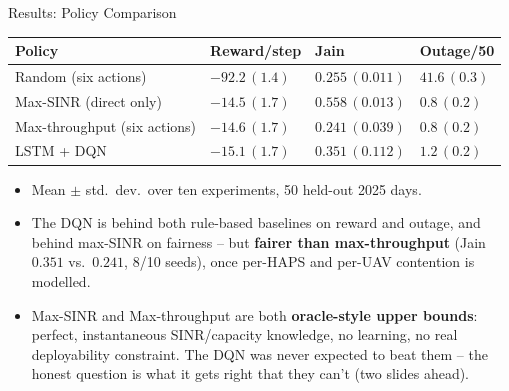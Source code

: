 \documentclass[aspectratio=169]{beamer}
\begin{document}
\begin{frame}{Results: Policy Comparison}
\footnotesize
\begin{table}
\centering
\begin{tabularx}{\linewidth}{|>{\raggedright\arraybackslash}X|>{\centering\arraybackslash}X|>{\centering\arraybackslash}X|>{\centering\arraybackslash}X|}
\hline
\textbf{Policy} & \textbf{Reward/step} & \textbf{Jain} & \textbf{Outage/50} \\
\hline
Random (six actions) & $-92.2\,(1.4)$ & $0.255\,(0.011)$ & $41.6\,(0.3)$ \\
\hline
Max-SINR (direct only) & $-14.5\,(1.7)$ & $\mathbf{0.558}\,(0.013)$ & $\mathbf{0.8}\,(0.2)$ \\
\hline
Max-throughput (six actions) & $\mathbf{-14.6}\,(1.7)$ & $0.241\,(0.039)$ & $\mathbf{0.8}\,(0.2)$ \\
\hline
LSTM + DQN & $-15.1\,(1.7)$ & $0.351\,(0.112)$ & $1.2\,(0.2)$ \\
\hline
\end{tabularx}
\end{table}
\begin{itemize}
  \item Mean $\pm$ std.\ dev.\ over ten experiments, 50 held-out 2025 days.
  \item The DQN is behind both rule-based baselines on reward and
        outage, and behind max-SINR on fairness -- but \textbf{fairer
        than max-throughput} (Jain $0.351$ vs.\ $0.241$, 8/10 seeds),
        once per-HAPS and per-UAV contention is modelled.
  \item Max-SINR and Max-throughput are both \textbf{oracle-style upper
        bounds}: perfect, instantaneous SINR/capacity knowledge, no
        learning, no real deployability constraint. The DQN was never
        expected to beat them -- the honest question is what it gets
        right that they can't (two slides ahead).
\end{itemize}
\end{frame}
\end{document}
